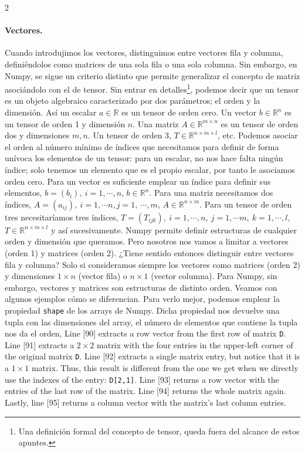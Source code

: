\begin{paracol}{2}
\paragraph{Vectores.}
Cuando introdujimos los vectores, distinguimos entre vectores fila y columna, definiéndolos como matrices de una sola fila o una sola columna. Sin embargo, en Numpy, se sigue un criterio distinto que permite generalizar el concepto de matriz asociándolo con el de tensor. Sin entrar en detalles\footnote{Una definición formal del concepto de tensor, queda fuera del alcance de estos apuntes.}, podemos decir que un tensor es un objeto algebraico caracterizado por dos parámetros; el orden y la dimensión. Así un escalar $a \in \mathbb{R}$ es un tensor de orden cero. Un vector $b \in \mathbb{R}^n$ es un tensor de orden 1 y dimensión $n$. Una matriz $A \in \mathbb{R}^{m\times n}$ es un tensor de orden dos y dimensiones $m,n$. Un tensor de orden 3, $T \in \mathbb{R}^{n\times m \times l}$, etc. Podemos asociar el orden al número mínimo de índices que necesitamos para definir de forma unívoca los elementos de un tensor: para un escalar, no nos hace falta ningún índice; solo tenemos un elemento que es el propio escalar, por tanto le asociamos orden cero. Para un vector es suficiente emplear un índice para definir sus elementos, $b=(b_i),\ i=1,\cdots, n$, $b \in \mathbb{R}^n$. Para una matriz necesitamos dos índices, $A=(a_{ij}),\ i =1, \cdots n, j = 1,\ \cdots, m$, $A \in \mathbb{R}^{n\times m}$. Para un tensor de orden tres necesitaríamos tres índices, $T=(T_{ijk}),\ i =1,\cdots, n,\ j =1,\cdots m,\ k = 1,\cdots, l$, $T\in \mathbb{R}^{n\times m \times l}$ y así sucesivamente. Numpy permite definir estructuras de cualquier orden y dimensión que queramos. Pero nosotros nos vamos a limitar a vectores (orden 1) y matrices (orden 2). ¿Tiene sentido entonces distinguir entre vectores fila y columna? Solo si consideramos siempre los vectores como matrices (orden 2) y dimensiones $1\times n$ (vector fila) o $n \times 1$ (vector columna). Para Numpy, sin embargo, vectores y matrices son estructuras de distinto orden. Veamos con algunos ejemplos cómo se diferencian. Para verlo mejor, podemos emplear la propiedad \texttt{shape} de los arrays de Numpy. Dicha propiedad nos devuelve una tupla con las dimensiones del array, el número de elementos que contiene la tupla nos da el orden,
\switchcolumn
Line [90] extracts a row vector from the first row of matrix \texttt{D}. Line [91] extracts a $2\times 2$ matrix with the four entries in the upper-left corner of the original matrix \texttt{D}. Line [92] extracts a single matrix entry, but notice that it is a $1\times 1$ matrix. Thus, this result is different from the one we get when we directly use the indexes of the entry: \texttt{D[2,1]}. Line [93] returns a row vector with the entries of the last row of the matrix. Line [94] returns the whole matrix again. Lastly, line [95] returns a column vector with the matrix's last column entries.


\end{paracol}
